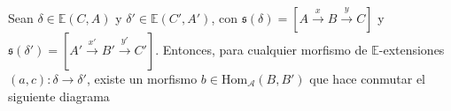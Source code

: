 \documentclass[preview]{standalone}
\begin{document}
\begin{center}
\justifying Sean $\delta\in\mathbb{E}(C,A)$ y $\delta'\in\mathbb{E}(C',A')$, con $\mathfrak{s}(\delta) = [A\xrightarrow{x} B\xrightarrow{y} C]$ y $\mathfrak{s}(\delta') = [A'\xrightarrow{x'} B'\xrightarrow{y'} C']$. Entonces, para cualquier morfismo de $\mathbb{E}$-extensiones $(a,c):\delta\to\delta'$, existe un morfismo $b\in\text{Hom}_\mathscr{A}(B,B')$ que hace conmutar el siguiente diagrama
\end{center}
\end{document}
